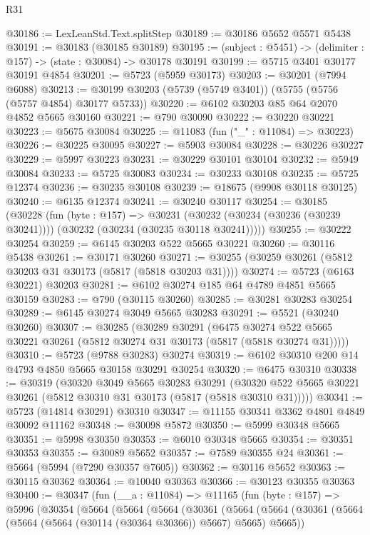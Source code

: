 \begin{lexlean}{R31}
\begin{coremodule}
@30186 := LexLeanStd.Text.splitStep
@30189 := @30186 @5652 @5571 @5438
@30191 := @30183 (@30185 @30189)
@30195 := (subject : @5451) -> (delimiter : @157) -> (state : @30084) -> @30178 @30191
@30199 := @5715 @3401 @30177 @30191 @4854
@30201 := @5723 (@5959 @30173)
@30203 := @30201 (@7994 @6088)
@30213 := @30199 @30203 (@5739 (@5749 @3401)) (@5755 (@5756 (@5757 @4854) @30177 @5733))
@30220 := @6102 @30203 @85 @64 @2070 @4852 @5665 @30160
@30221 := @790 @30090
@30222 := @30220 @30221
@30223 := @5675 @30084
@30225 := @11083 (fun ("_" : @11084) => @30223)
@30226 := @30225 @30095
@30227 := @5903 @30084
@30228 := @30226 @30227
@30229 := @5997 @30223
@30231 := @30229 @30101 @30104
@30232 := @5949 @30084
@30233 := @5725 @30083
@30234 := @30233 @30108
@30235 := @5725 @12374
@30236 := @30235 @30108
@30239 := @18675 (@9908 @30118 @30125)
@30240 := @6135 @12374
@30241 := @30240 @30117
@30254 := @30185
    (@30228
      (fun (byte : @157) =>
      @30231 (@30232 (@30234 (@30236 (@30239 @30241)))) (@30232 (@30234 (@30235 @30118 @30241)))))
@30255 := @30222 @30254
@30259 := @6145 @30203 @522 @5665 @30221
@30260 := @30116 @5438
@30261 := @30171 @30260
@30271 := @30255 (@30259 @30261 (@5812 @30203 @31 @30173 (@5817 (@5818 @30203 @31))))
@30274 := @5723 (@6163 @30221) @30203
@30281 := @6102 @30274 @185 @64 @4789 @4851 @5665 @30159
@30283 := @790 (@30115 @30260)
@30285 := @30281 @30283 @30254
@30289 := @6145 @30274 @3049 @5665 @30283
@30291 := @5521 (@30240 @30260)
@30307 := @30285
    (@30289
      @30291
      (@6475 @30274 @522 @5665 @30221 @30261 (@5812 @30274 @31 @30173 (@5817 (@5818 @30274 @31)))))
@30310 := @5723 (@9788 @30283) @30274
@30319 := @6102 @30310 @200 @14 @4793 @4850 @5665 @30158 @30291 @30254
@30320 := @6475 @30310
@30338 := @30319
    (@30320
      @3049
      @5665
      @30283
      @30291
      (@30320 @522 @5665 @30221 @30261 (@5812 @30310 @31 @30173 (@5817 (@5818 @30310 @31)))))
@30341 := @5723 (@14814 @30291) @30310
@30347 := @11155 @30341 @3362 @4801 @4849 @30092 @11162
@30348 := @30098 @5872
@30350 := @5999 @30348 @5665
@30351 := @5998 @30350
@30353 := @6010 @30348 @5665
@30354 := @30351 @30353
@30355 := @30089 @5652
@30357 := @7589 @30355 @24
@30361 := @5664 (@5994 (@7290 @30357 @7605))
@30362 := @30116 @5652
@30363 := @30115 @30362
@30364 := @10040 @30363
@30366 := @30123 @30355 @30363
@30400 := @30347
    (fun (__a : @11084) =>
    @11165
      (fun (byte : @157) =>
      @5996
        (@30354
          (@5664
            (@5664
              (@5664
                (@30361
                  (@5664
                    (@5664
                      (@30361 (@5664 (@5664 (@5664 (@30114 (@30364 @30366)) @5667) @5665) @5665))

\end{coremodule}
\end{lexlean}
